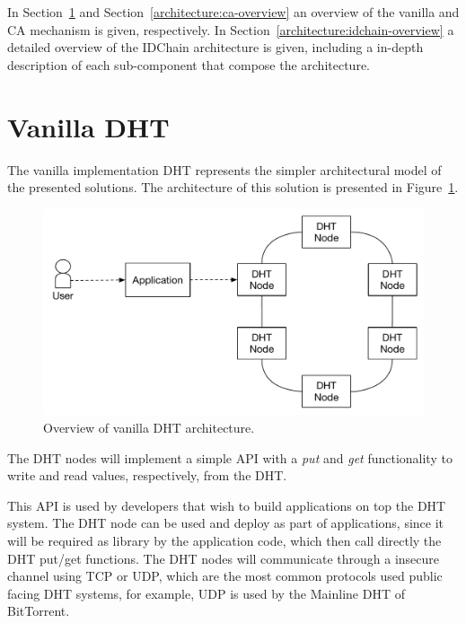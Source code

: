 In Section~\ref{architecture:vanilla-overview} and Section~\ref{architecture:ca-overview} an overview of the vanilla and \ac{CA} mechanism is given, respectively.
In Section~\ref{architecture:idchain-overview} a detailed overview of the IDChain architecture is given, including a in-depth description of each sub-component that compose the architecture.

\section{Vanilla DHT}\label{architecture:vanilla-overview}

The vanilla implementation DHT represents the simpler architectural model of the presented solutions.
The architecture of this solution is presented in Figure~\ref{fig:architecture-vanilla-overview}.

\begin{figure}
  \centering
  \includegraphics[scale=0.5]{Figures/architecture-overview-none.pdf}
  \caption{Overview of vanilla DHT architecture.}
\label{fig:architecture-vanilla-overview}
\end{figure}

The DHT nodes will implement a simple \ac{API} with a \textit{put} and \textit{get} functionality to write and read values, respectively, from the \ac{DHT}.

This \ac{API} is used by developers that wish to build applications on top the DHT system.
The DHT node can be used and deploy as part of applications, since it will be required as library by the application code, which then call directly the DHT put/get functions.
The \ac{DHT} nodes will communicate through a insecure channel using TCP or UDP, which are the most common protocols used public facing DHT systems, for example, UDP is used by the Mainline DHT of BitTorrent.

